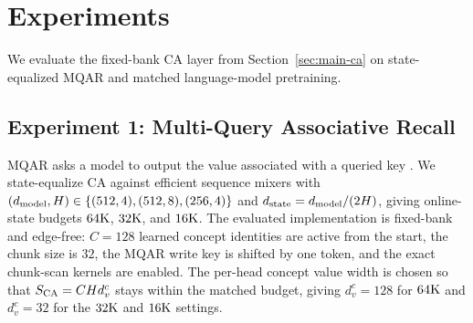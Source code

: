 \section{Experiments}
\label{sec:main-experiments}

We evaluate the fixed-bank CA layer from Section~\ref{sec:main-ca} on state-equalized MQAR and matched language-model pretraining.

\subsection{Experiment 1: Multi-Query Associative Recall}
\label{sec:exp-mqar}

MQAR asks a model to output the value associated with a queried key \citep{arora2024zoology}. We state-equalize CA against efficient sequence mixers with $(d_{\rm model},H)\in\{(512,4),(512,8),(256,4)\}$ and $d_{\rm state}=d_{\rm model}/(2H)$, giving online-state budgets $64{\rm K}$, $32{\rm K}$, and $16{\rm K}$. The evaluated implementation is fixed-bank and edge-free: $C=128$ learned concept identities are active from the start, the chunk size is $32$, the MQAR write key is shifted by one token, and the exact chunk-scan kernels are enabled. The per-head concept value width is chosen so that $S_{\rm CA}=C H d_v^c$ stays within the matched budget, giving $d_v^c=128$ for $64{\rm K}$ and $d_v^c=32$ for the $32{\rm K}$ and $16{\rm K}$ settings.

